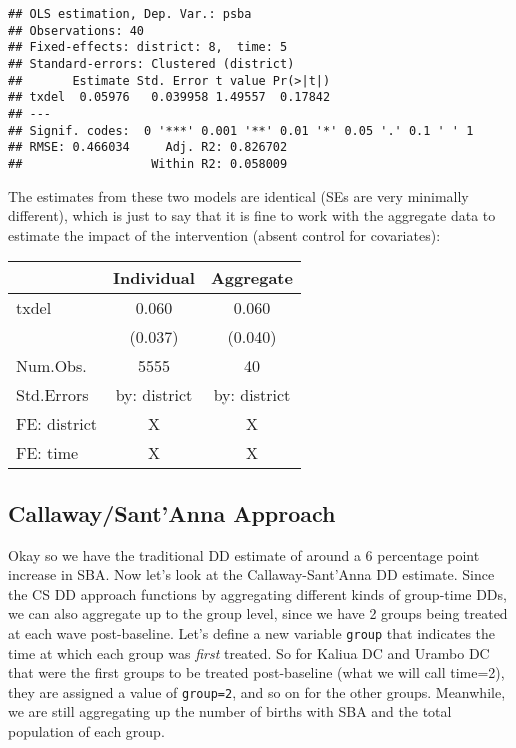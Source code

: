 \documentclass[
]{article}
\begin{document}
\begin{verbatim}
## OLS estimation, Dep. Var.: psba
## Observations: 40 
## Fixed-effects: district: 8,  time: 5
## Standard-errors: Clustered (district) 
##       Estimate Std. Error t value Pr(>|t|) 
## txdel  0.05976   0.039958 1.49557  0.17842 
## ---
## Signif. codes:  0 '***' 0.001 '**' 0.01 '*' 0.05 '.' 0.1 ' ' 1
## RMSE: 0.466034     Adj. R2: 0.826702
##                  Within R2: 0.058009
\end{verbatim}

The estimates from these two models are identical (SEs are very
minimally different), which is just to say that it is fine to work with
the aggregate data to estimate the impact of the intervention (absent
control for covariates):

\begin{table}
\centering
\begin{tabular}[t]{lcc}
\toprule
  & Individual & Aggregate\\
\midrule
txdel & \num{0.060} & \num{0.060}\\
 & (\num{0.037}) & (\num{0.040})\\
\midrule
Num.Obs. & \num{5555} & \num{40}\\
Std.Errors & by: district & by: district\\
FE: district & X & X\\
FE: time & X & X\\
\bottomrule
\end{tabular}
\end{table}

\hypertarget{callawaysantanna-approach}{%
\subsection{Callaway/Sant'Anna
Approach}\label{callawaysantanna-approach}}

Okay so we have the traditional DD estimate of around a 6 percentage
point increase in SBA. Now let's look at the Callaway-Sant'Anna DD
estimate. Since the CS DD approach functions by aggregating different
kinds of group-time DDs, we can also aggregate up to the group level,
since we have 2 groups being treated at each wave post-baseline. Let's
define a new variable \texttt{group} that indicates the time at which
each group was \emph{first} treated. So for Kaliua DC and Urambo DC that
were the first groups to be treated post-baseline (what we will call
time=2), they are assigned a value of \texttt{group=2}, and so on for
the other groups. Meanwhile, we are still aggregating up the number of
births with SBA and the total population of each group.
\end{document}
